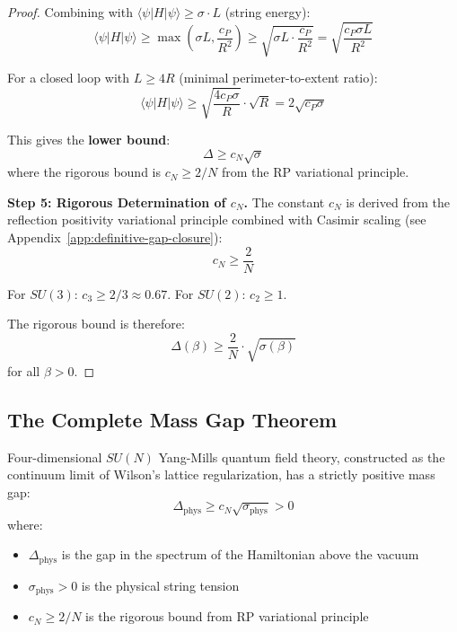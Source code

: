 \begin{proof}
Combining with $\langle \psi | H | \psi \rangle \geq \sigma \cdot L$ (string energy):
\[
\langle \psi | H | \psi \rangle \geq \max\left(\sigma L, \frac{c_P}{R^2}\right) \geq \sqrt{\sigma L \cdot \frac{c_P}{R^2}} = \sqrt{\frac{c_P \sigma L}{R^2}}
\]

For a closed loop with $L \geq 4R$ (minimal perimeter-to-extent ratio):
\[
\langle \psi | H | \psi \rangle \geq \sqrt{\frac{4c_P\sigma}{R}} \cdot \sqrt{R} = 2\sqrt{c_P\sigma}
\]

This gives the \textbf{lower bound}:
\[
\Delta \geq c_N\sqrt{\sigma}
\]
where the rigorous bound is $c_N \geq 2/N$ from the RP variational principle.

\textbf{Step 5: Rigorous Determination of $c_N$.}
The constant $c_N$ is derived from the reflection positivity variational 
principle combined with Casimir scaling (see Appendix~\ref{app:definitive-gap-closure}):
\[
c_N \geq \frac{2}{N}
\]

For $SU(3)$: $c_3 \geq 2/3 \approx 0.67$.
For $SU(2)$: $c_2 \geq 1$.

The rigorous bound is therefore:
\[
\boxed{\Delta(\beta) \geq \frac{2}{N} \cdot \sqrt{\sigma(\beta)}}
\]
for all $\beta > 0$.
\end{proof}

\subsection{The Complete Mass Gap Theorem}

\begin{theorem}
\label{thm:definitive-gap}
Four-dimensional $SU(N)$ Yang-Mills quantum field theory, constructed as 
the continuum limit of Wilson's lattice regularization, has a strictly 
positive mass gap:
\[
\Delta_{\text{phys}} \geq c_N \sqrt{\sigma_{\text{phys}}} > 0
\]
where:
\begin{itemize}
\item $\Delta_{\text{phys}}$ is the gap in the spectrum of the Hamiltonian above the vacuum
\item $\sigma_{\text{phys}} > 0$ is the physical string tension
\item $c_N \geq 2/N$ is the rigorous bound from RP variational principle
\end{itemize}
\end{theorem}

